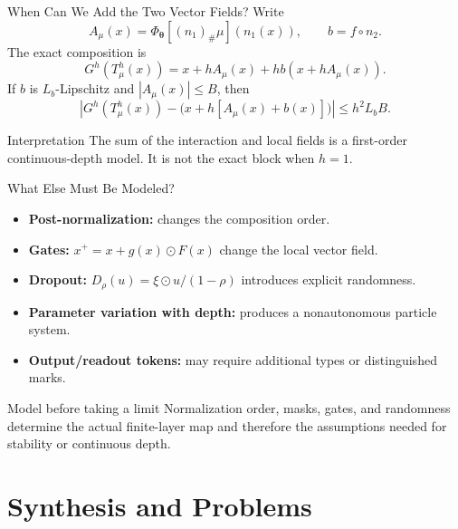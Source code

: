 \documentclass[aspectratio=169,11pt]{beamer}
\newcommand{\abs}[1]{\left\lvert#1\right\rvert}
\begin{document}
\begin{frame}{When Can We Add the Two Vector Fields?}
Write
\[
 A_\mu(x)=\Phi_{\boldsymbol\theta}[(n_1)_\#\mu](n_1(x)),
 \qquad b=f\circ n_2.
\]
The exact composition is
\[
 G^h(T_\mu^h(x))=x+hA_\mu(x)+h b(x+hA_\mu(x)).
\]
If $b$ is $L_b$-Lipschitz and $\abs{A_\mu(x)}\le B$, then
\[
 \abs{G^h(T_\mu^h(x))-\bigl(x+h[A_\mu(x)+b(x)]\bigr)}
 \le h^2L_bB.
\]

\begin{block}{Interpretation}
The sum of the interaction and local fields is a first-order continuous-depth model.  It is not the exact block when $h=1$.
\end{block}
\end{frame}

\begin{frame}{What Else Must Be Modeled?}
\begin{itemize}
\item \textbf{Post-normalization:} changes the composition order.
\item \textbf{Gates:} $x^+=x+g(x)\odot F(x)$ change the local vector field.
\item \textbf{Dropout:} $D_\rho(u)=\xi\odot u/(1-\rho)$ introduces explicit randomness.
\item \textbf{Parameter variation with depth:} produces a nonautonomous particle system.
\item \textbf{Output/readout tokens:} may require additional types or distinguished marks.
\end{itemize}

\begin{alertblock}{Model before taking a limit}
Normalization order, masks, gates, and randomness determine the actual finite-layer map and therefore the assumptions needed for stability or continuous depth.
\end{alertblock}
\end{frame}

\section{Synthesis and Problems}
\end{document}

